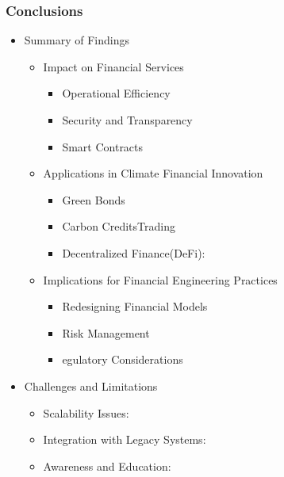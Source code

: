 \documentclass{beamer}
\begin{document}
\begin{frame}
    \frametitle{Conclusions}
    \begin{itemize}
        \item Summary of Findings
        \begin{itemize}
            \item Impact on Financial Services
            \begin{itemize}
                \item Operational Efficiency
                \item Security and Transparency 
                \item Smart Contracts
            \end{itemize}
            \item  Applications in Climate Financial Innovation
            \begin{itemize}
                \item Green Bonds
                \item Carbon CreditsTrading
                \item Decentralized Finance(DeFi):
            \end{itemize}
            \item  Implications for Financial Engineering Practices        \begin{itemize}
                \item Redesigning Financial Models
                \item Risk Management
                \item egulatory Considerations
        \end{itemize}


        \end{itemize}
        \item Challenges and Limitations
        \begin{itemize}
            \item Scalability Issues: 
            \item Integration with Legacy Systems: 
            \item Awareness and Education: 
        \end{itemize}
    \end{itemize}
\end{frame}
\end{document}
